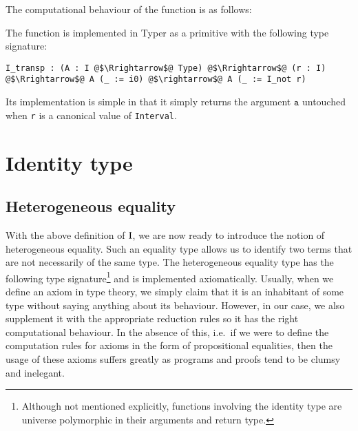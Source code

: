 \documentclass[12pt,twoside,maitrise]{dms}
\theoremstyle{definition}
\numberwithin{equation}{section}
\numberwithin{table}{chapter}
\numberwithin{figure}{chapter}
\newcommand\id[1] {\texttt{#1}}
\begin{document}
The computational behaviour of the function is as follows:

\begin{prooftree*}
  \infer0{\Funapp{\id{I\_transp}}{\id{A}}{\ileft}{\id{a}} \rightsquigarrow \id{a}}
\end{prooftree*}

\begin{prooftree*}
  \infer0{\Funapp{\id{I\_transp}}{\id{A}}{\iright}{\id{a}} \rightsquigarrow \id{a}}
\end{prooftree*}

The function is implemented in Typer as a primitive with the following type
signature:

\begin{verbatim}
I_transp : (A : I @$\Rrightarrow$@ Type) @$\Rrightarrow$@ (r : I) @$\Rrightarrow$@ A (_ := i0) @$\rightarrow$@ A (_ := I_not r)
\end{verbatim}

Its implementation is simple in that it simply returns the argument $\id{a}$
untouched when \id{r} is a canonical value of \id{Interval}.

\section{Identity type}\label{sec:identity}

\subsection{Heterogeneous equality}
With the above definition of $\mathrm{I}$, we are now ready to introduce the notion of
heterogeneous equality. Such an equality type allows us to identify two terms
that are not necessarily of the same type. The heterogeneous equality type has
the following type signature\footnote{Although not mentioned explicitly,
functions involving the identity type are universe polymorphic in their
arguments and return type.} and is implemented axiomatically. Usually, when we
define an axiom in type theory, we simply claim that it is an inhabitant of some
type without saying anything about its behaviour. However, in our case, we also
supplement it with the appropriate reduction rules so it has the right
computational behaviour. In the absence of this, i.e.\ if we were to define the
computation rules for axioms in the form of propositional equalities, then the
usage of these axioms suffers greatly as programs and proofs tend to be clumsy
and inelegant.
\end{document}
